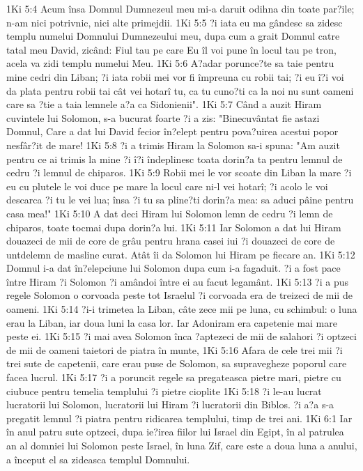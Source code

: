 1Ki 5:4  Acum însa Domnul Dumnezeul meu mi-a daruit odihna din toate par?ile; n-am nici potrivnic, nici alte primejdii.
1Ki 5:5  ?i iata eu ma gândesc sa zidesc templu numelui Domnului Dumnezeului meu, dupa cum a grait Domnul catre tatal meu David, zicând: Fiul tau pe care Eu îl voi pune în locul tau pe tron, acela va zidi templu numelui Meu.
1Ki 5:6  A?adar porunce?te sa taie pentru mine cedri din Liban; ?i iata robii mei vor fi împreuna cu robii tai; ?i eu î?i voi da plata pentru robii tai cât vei hotarî tu, ca tu cuno?ti ca la noi nu sunt oameni care sa ?tie a taia lemnele a?a ca Sidonienii".
1Ki 5:7  Când a auzit Hiram cuvintele lui Solomon, s-a bucurat foarte ?i a zis: "Binecuvântat fie astazi Domnul, Care a dat lui David fecior în?elept pentru pova?uirea acestui popor nesfâr?it de mare!
1Ki 5:8  ?i a trimis Hiram la Solomon sa-i spuna: "Am auzit pentru ce ai trimis la mine ?i î?i îndeplinesc toata dorin?a ta pentru lemnul de cedru ?i lemnul de chiparos.
1Ki 5:9  Robii mei le vor scoate din Liban la mare ?i eu cu plutele le voi duce pe mare la locul care ni-l vei hotarî; ?i acolo le voi descarca ?i tu le vei lua; însa ?i tu sa pline?ti dorin?a mea: sa aduci pâine pentru casa mea!"
1Ki 5:10  A dat deci Hiram lui Solomon lemn de cedru ?i lemn de chiparos, toate tocmai dupa dorin?a lui.
1Ki 5:11  Iar Solomon a dat lui Hiram douazeci de mii de core de grâu pentru hrana casei iui ?i douazeci de core de untdelemn de masline curat. Atât îi da Solomon lui Hiram pe fiecare an.
1Ki 5:12  Domnul i-a dat în?elepciune lui Solomon dupa cum i-a fagaduit. ?i a fost pace între Hiram ?i Solomon ?i amândoi între ei au facut legamânt.
1Ki 5:13  ?i a pus regele Solomon o corvoada peste tot Israelul ?i corvoada era de treizeci de mii de oameni.
1Ki 5:14  ?i-i trimetea la Liban, câte zece mii pe luna, cu schimbul: o luna erau la Liban, iar doua luni la casa lor. Iar Adoniram era capetenie mai mare peste ei.
1Ki 5:15  ?i mai avea Solomon înca ?aptezeci de mii de salahori ?i optzeci de mii de oameni taietori de piatra în munte,
1Ki 5:16  Afara de cele trei mii ?i trei sute de capetenii, care erau puse de Solomon, sa supravegheze poporul care facea lucrul.
1Ki 5:17  ?i a poruncit regele sa pregateasca pietre mari, pietre cu ciubuce pentru temelia templului ?i pietre cioplite
1Ki 5:18  ?i le-au lucrat lucratorii lui Solomon, lucratorii lui Hiram ?i lucratorii din Biblos. ?i a?a s-a pregatit lemnul ?i piatra pentru ridicarea templului, timp de trei ani.
1Ki 6:1  Iar în anul patru sute optzeci, dupa ie?irea fiilor lui Israel din Egipt, în al patrulea an al domniei lui Solomon peste Israel, în luna Zif, care este a doua luna a anului, a început el sa zideasca templul Domnului.
